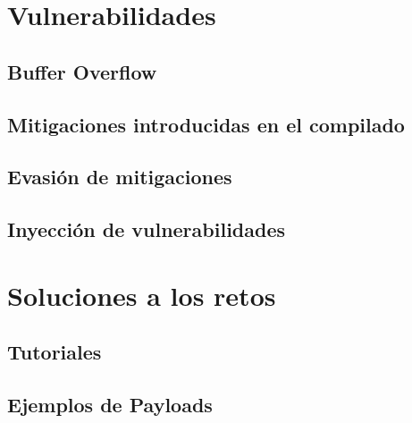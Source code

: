 \section{Vulnerabilidades}
\subsection{Buffer Overflow}
\subsection{Mitigaciones introducidas en el compilado}
\subsection{Evasión de mitigaciones}
\subsection{Inyección de vulnerabilidades} \label{subsec:vulns}
\section{Soluciones a los retos}
\subsection{Tutoriales}
\subsection{Ejemplos de Payloads}